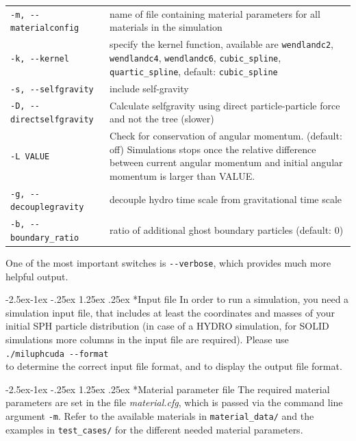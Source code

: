 \documentclass[10pt,fleqn,twoside]{article}
\makeatletter
\renewcommand\paragraph{\@startsection{paragraph}{4}{\z@}%
            {-2.5ex\@plus -1ex \@minus -.25ex}%
            {1.25ex \@plus .25ex}%
            {\normalfont\normalsize\bfseries}}
\makeatother
\begin{document}
\begin{table}
\begin{tabular}[b]{p{5cm} p{9cm}}
\verb|-m, --materialconfig|		&	name of file containing material parameters for all materials in the simulation		\\
\verb|-k, --kernel|		&	specify the kernel function, available are \verb|wendlandc2|, \verb|wendlandc4|, \verb|wendlandc6|, \verb|cubic_spline|, \verb|quartic_spline|, default: \verb|cubic_spline|		\\
\verb|-s, --selfgravity|	&	include self-gravity		\\
\verb|-D, --directselfgravity| & 	Calculate selfgravity using direct particle-particle force and not the tree (slower) \\
\verb|-L VALUE| &  Check for conservation of angular momentum. (default: off)
    Simulations stops once the relative difference between current angular momentum and initial
    angular momentum is larger than VALUE. \\
\verb|-g, --decouplegravity|	&	decouple hydro time scale from gravitational time scale	\\
\verb|-b, --boundary_ratio|	&	ratio of additional ghost boundary particles (default: 0)	\\
\hline
\end{tabular}
\label{tab:cmd-line-options}
\end{table}

One of the most important switches is \verb|--verbose|, which provides much more helpful output.


\paragraph*{Input file}
In order to run a simulation, you need a simulation input file, that includes at least the coordinates and masses of your initial SPH particle distribution (in case of a HYDRO simulation, for SOLID simulations more columns in the input file are required).
Please use\\
\verb|./miluphcuda --format|\\
to determine the correct input file format, and to display the output file format.


\paragraph*{Material parameter file}
The required material parameters are set in the file \emph{material.cfg}, which is passed via the command line argument \verb|-m|. Refer to the available materials in \verb|material_data/| and the examples in \verb|test_cases/| for the different needed material parameters.
\end{document}
